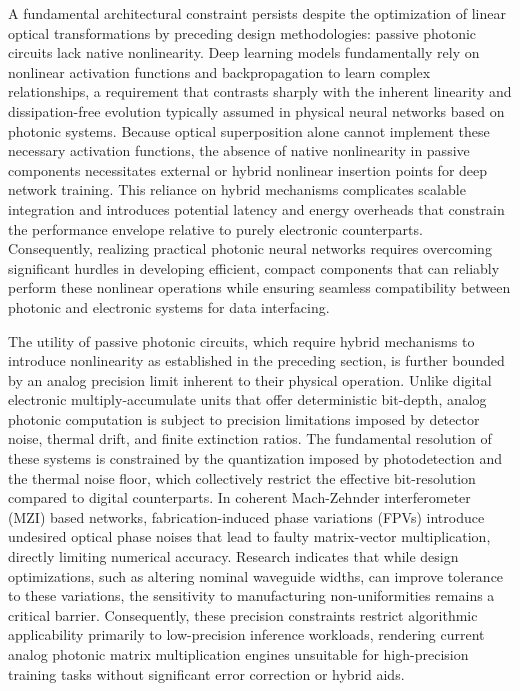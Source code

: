 A fundamental architectural constraint persists despite the optimization of linear optical transformations by preceding design methodologies: passive photonic circuits lack native nonlinearity. Deep learning models fundamentally rely on nonlinear activation functions and backpropagation to learn complex relationships, a requirement that contrasts sharply with the inherent linearity and dissipation-free evolution typically assumed in physical neural networks based on photonic systems. \citep{doi_10_1002_adma_202522820_5596700a} Because optical superposition alone cannot implement these necessary activation functions, the absence of native nonlinearity in passive components necessitates external or hybrid nonlinear insertion points for deep network training. This reliance on hybrid mechanisms complicates scalable integration and introduces potential latency and energy overheads that constrain the performance envelope relative to purely electronic counterparts. Consequently, realizing practical photonic neural networks requires overcoming significant hurdles in developing efficient, compact components that can reliably perform these nonlinear operations while ensuring seamless compatibility between photonic and electronic systems for data interfacing. \citep{doi_10_1038_s41586_021_04223_6_6158a5ea} \citep{doi_10_1515_nanoph_2019_0474_d2187501} \citep{doi_10_3390_nano14080697_c372a140}

The utility of passive photonic circuits, which require hybrid mechanisms to introduce nonlinearity as established in the preceding section, is further bounded by an analog precision limit inherent to their physical operation. Unlike digital electronic multiply-accumulate units that offer deterministic bit-depth, analog photonic computation is subject to precision limitations imposed by detector noise, thermal drift, and finite extinction ratios. The fundamental resolution of these systems is constrained by the quantization imposed by photodetection and the thermal noise floor, which collectively restrict the effective bit-resolution compared to digital counterparts. In coherent Mach-Zehnder interferometer (MZI) based networks, fabrication-induced phase variations (FPVs) introduce undesired optical phase noises that lead to faulty matrix-vector multiplication, directly limiting numerical accuracy. Research indicates that while design optimizations, such as altering nominal waveguide widths, can improve tolerance to these variations, the sensitivity to manufacturing non-uniformities remains a critical barrier. Consequently, these precision constraints restrict algorithmic applicability primarily to low-precision inference workloads, rendering current analog photonic matrix multiplication engines unsuitable for high-precision training tasks without significant error correction or hybrid aids. \citep{doi_10_3390_nano14080697_c372a140} \citep{doi_10_3390_nano14080697_c372a140} \citep{doi_10_1109_tnano_2022_3223915_d4da3e6b} \citep{doi_10_1515_nanoph_2022_0423_38a2c3ec}

